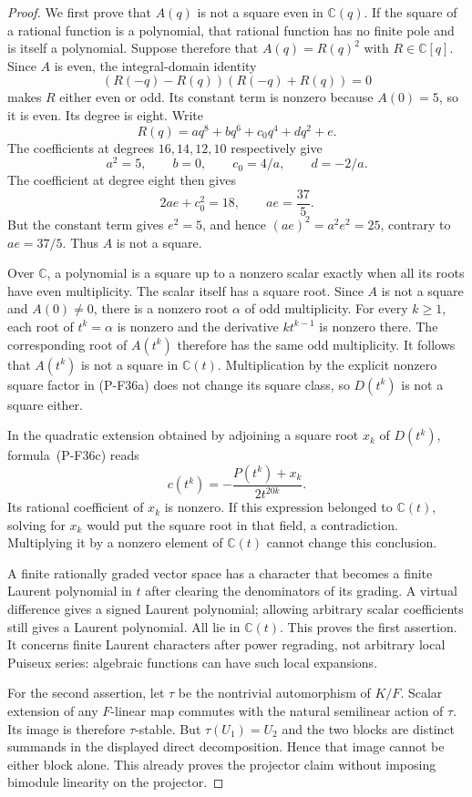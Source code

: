 \begin{proof}
We first prove that $A(q)$ is not a square even in $\mathbb C(q)$.
If the square of a rational function is a polynomial, that rational
function has no finite pole and is itself a polynomial. Suppose
therefore that $A(q)=R(q)^2$ with $R\in\mathbb C[q]$.
Since $A$ is even, the integral-domain identity
\[
 (R(-q)-R(q))(R(-q)+R(q))=0
\]
makes $R$ either even or odd. Its constant term is nonzero because
$A(0)=5$, so it is even. Its degree is eight. Write
\[
 R(q)=a q^8+b q^6+c_0 q^4+d q^2+e.
\]
The coefficients at degrees $16,14,12,10$ respectively give
\[
 a^2=5,\qquad b=0,\qquad c_0=4/a,\qquad d=-2/a.
\]
The coefficient at degree eight then gives
\[
 2ae+c_0^2=18,
 \qquad ae=\frac{37}{5}.
\]
But the constant term gives $e^2=5$, and hence
$(ae)^2=a^2e^2=25$, contrary to $ae=37/5$.
Thus $A$ is not a square.

Over $\mathbb C$, a polynomial is a square up to a nonzero scalar
exactly when all its roots have even multiplicity. The scalar
itself has a square root. Since $A$ is not a square and $A(0)\ne0$,
there is a nonzero root $\alpha$ of odd multiplicity. For every
$k\ge1$, each root of $t^k=\alpha$ is nonzero and the derivative
$kt^{k-1}$ is nonzero there. The corresponding root of $A(t^k)$
therefore has the same odd multiplicity. It follows that
$A(t^k)$ is not a square in $\mathbb C(t)$. Multiplication by the
explicit nonzero square factor in (P-F36a) does not change its
square class, so $D(t^k)$ is not a square either.

In the quadratic extension obtained by adjoining a square root
$x_k$ of $D(t^k)$, formula~(P-F36c) reads
\[
 c(t^k)=-\frac{P(t^k)+x_k}{2t^{20k}}.
\]
Its rational coefficient of $x_k$ is nonzero. If this expression
belonged to $\mathbb C(t)$, solving for $x_k$ would put the
square root in that field, a contradiction. Multiplying it by
a nonzero element of $\mathbb C(t)$ cannot change this conclusion.

A finite rationally graded vector space has a character that
becomes a finite Laurent polynomial in $t$ after clearing the
denominators of its grading. A virtual difference gives a signed
Laurent polynomial; allowing arbitrary scalar coefficients still
gives a Laurent polynomial. All lie in $\mathbb C(t)$.
This proves the first assertion. It concerns finite Laurent
characters after power regrading, not arbitrary local Puiseux
series: algebraic functions can have such local expansions.

For the second assertion, let $\tau$ be the nontrivial automorphism
of $K/F$. Scalar extension of any $F$-linear map commutes with
the natural semilinear action of $\tau$. Its image is therefore
$\tau$-stable. But $\tau(U_1)=U_2$ and the two blocks are distinct
summands in the displayed direct decomposition. Hence that image
cannot be either block alone. This already proves the projector
claim without imposing bimodule linearity on the projector.


\end{proof}

